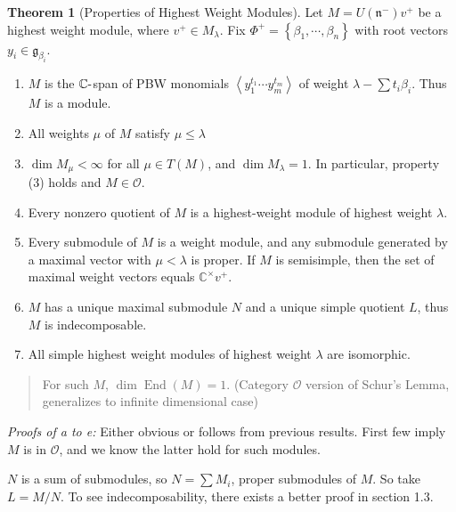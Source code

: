 \documentclass[11pt]{scrartcl}
\theoremstyle{definition}
\theoremstyle{theorem}
\newtheorem{theorem}{Theorem}[section]
\theoremstyle{proof}
\newenvironment{proof}
{\pushQED{$\qed$}\pf}
{\par\popQED\endpf}
\theoremstyle{definition}
\theoremstyle{break}
\theoremstyle{problem}
\providecommand{\tightlist}{%
  \setlength{\itemsep}{0pt}\setlength{\parskip}{0pt}}
\def\endo{\operatorname{End}}
\newcommand{\CC}[0]{{\mathbb{C}}}
\newcommand{\dash}[0]{{\hbox{-}}}
\newcommand{\generators}[1]{\left\langle{#1}\right\rangle}
\newcommand{\lieg}[0]{{\mathfrak{g}}}
\newcommand{\lien}[0]{{\mathfrak{n}}}
\newcommand{\theset}[1]{\left\{{#1}\right\}}
\newcommand{\units}[0]{^{\times}}
\renewcommand{\qed}[0]{\hfill\blacksquare}
\begin{document}
\begin{theorem}[Properties of Highest Weight Modules]

Let \(M = U(\lien^-)v^+\) be a highest weight module, where
\(v^+ \in M_\lambda\). Fix
\(\Phi^+ = \theset{\beta_1, \cdots, \beta_n}\) with root vectors
\(y_i \in \lieg_{\beta_i}\).

\begin{enumerate}
\def\labelenumi{\alph{enumi}.}
\tightlist
\item
  \(M\) is the \(\CC\dash\)span of PBW monomials
  \(\generators{ y_1^{t_1} \cdots y_m^{t_m}}\) of weight
  \(\lambda - \sum t_i \beta_i\). Thus \(M\) is a module.
\item
  All weights \(\mu\) of \(M\) satisfy \(\mu \leq \lambda\)
\item
  \(\dim M_\mu < \infty\) for all \(\mu \in T(M)\), and
  \(\dim M_\lambda = 1\). In particular, property (3) holds and
  \(M \in \mathcal O\).
\item
  Every nonzero quotient of \(M\) is a highest-weight module of highest
  weight \(\lambda\).
\item
  Every submodule of \(M\) is a weight module, and any submodule
  generated by a maximal vector with \(\mu < \lambda\) is proper. If
  \(M\) is semisimple, then the set of maximal weight vectors equals
  \(\CC\units v^+\).
\item
  \(M\) has a unique maximal submodule \(N\) and a unique simple
  quotient \(L\), thus \(M\) is indecomposable.
\item
  All simple highest weight modules of highest weight \(\lambda\) are
  isomorphic.
\end{enumerate}

\begin{quote}
For such \(M\), \(\dim \endo(M) = 1\). (Category \(\mathcal O\) version
of Schur's Lemma, generalizes to infinite dimensional case)
\end{quote}

\end{theorem}

\emph{Proofs of a to e:} Either obvious or follows from previous
results. First few imply \(M\) is in \(\mathcal O\), and we know the
latter hold for such modules.

\begin{proof}[of (f)]

\(N\) is a sum of submodules, so \(N = \sum M_i\), proper submodules of
\(M\). So take \(L = M/N\). To see indecomposability, there exists a
better proof in section 1.3.\end{proof}
\end{document}
